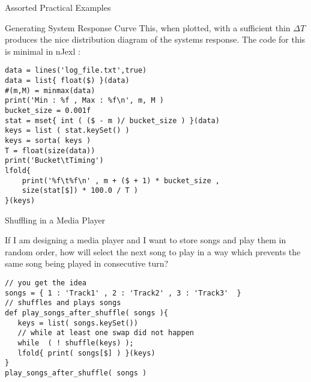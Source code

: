 \begin{section}{Assorted Practical Examples}
\begin{subsection}{Generating System Response Curve}
This, when plotted, with a sufficient thin $\Delta T$ produces the nice distribution diagram
of the systems response.
The code for this is minimal in nJexl :

\begin{center}\begin{minipage}{\linewidth}
\begin{lstlisting}[style=JexlStyle]
data = lines('log_file.txt',true)
data = list{ float($) }(data)
#(m,M) = minmax(data)
print('Min : %f , Max : %f\n', m, M )
bucket_size = 0.001f
stat = mset{ int ( ($ - m )/ bucket_size ) }(data)
keys = list ( stat.keySet() )
keys = sorta( keys )
T = float(size(data)) 
print('Bucket\tTiming')
lfold{
    print('%f\t%f\n' , m + ($ + 1) * bucket_size , 
    size(stat[$]) * 100.0 / T )
}(keys)
\end{lstlisting}  
\end{minipage}\end{center}
\end{subsection}

\begin{subsection}{Shuffling in a Media Player}

If I am designing a media player and I want to store songs and play them in random order, 
how will select the next song to play in a way which prevents the same song being played in consecutive turn?

\begin{center}\begin{minipage}{\linewidth}
\begin{lstlisting}[style=JexlStyle]
// you get the idea 
songs = { 1 : 'Track1' , 2 : 'Track2' , 3 : 'Track3'  }
// shuffles and plays songs 
def play_songs_after_shuffle( songs ){
   keys = list( songs.keySet())
   // while at least one swap did not happen 
   while  ( ! shuffle(keys) );
   lfold{ print( songs[$] ) }(keys)
}
play_songs_after_shuffle( songs )
\end{lstlisting}  
\end{minipage}\end{center}

\end{subsection}

\end{section}

